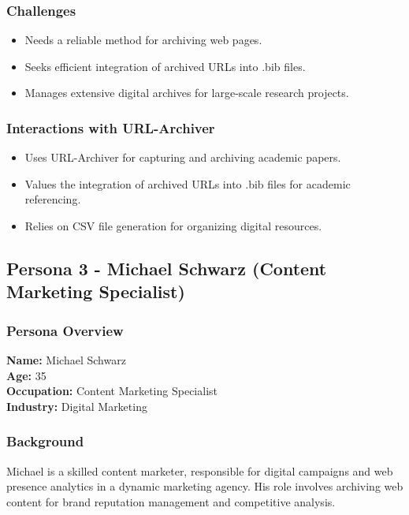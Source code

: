 \subsubsection{Challenges}
\begin{itemize}
    \item Needs a reliable method for archiving web pages.
    \item Seeks efficient integration of archived URLs into .bib files.
    \item Manages extensive digital archives for large-scale research projects.
\end{itemize}

\subsubsection{Interactions with URL-Archiver}
\begin{itemize}
    \item Uses URL-Archiver for capturing and archiving academic papers.
    \item Values the integration of archived URLs into .bib files for academic referencing.
    \item Relies on CSV file generation for organizing digital resources.
\end{itemize}

\subsection{Persona 3 - Michael Schwarz (Content Marketing Specialist)}

\subsubsection{Persona Overview}

\textbf{Name:} Michael Schwarz \\
\textbf{Age:} 35 \\
\textbf{Occupation:} Content Marketing Specialist \\
\textbf{Industry:} Digital Marketing

\subsubsection{Background}
Michael is a skilled content marketer, responsible for digital campaigns and web presence analytics in a dynamic marketing agency.
His role involves archiving web content for brand reputation management and competitive analysis.


